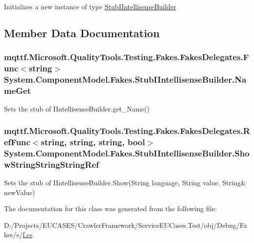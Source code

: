 Initializes a new instance of type \hyperlink{class_system_1_1_component_model_1_1_fakes_1_1_stub_i_intellisense_builder}{Stub\-I\-Intellisense\-Builder}



\subsection{Member Data Documentation}
\hypertarget{class_system_1_1_component_model_1_1_fakes_1_1_stub_i_intellisense_builder_a41a923772589db31412fe748a8acfd39}{
\subsubsection[{Name\-Get}]{\setlength{\rightskip}{0pt plus 5cm}mqttf.\-Microsoft.\-Quality\-Tools.\-Testing.\-Fakes.\-Fakes\-Delegates.\-Func$<$string$>$ System.\-Component\-Model.\-Fakes.\-Stub\-I\-Intellisense\-Builder.\-Name\-Get}}\label{class_system_1_1_component_model_1_1_fakes_1_1_stub_i_intellisense_builder_a41a923772589db31412fe748a8acfd39}


Sets the stub of I\-Intellisense\-Builder.\-get\-\_\-\-Name()

\hypertarget{class_system_1_1_component_model_1_1_fakes_1_1_stub_i_intellisense_builder_ac8894628bd802d4fc3fa15787f109384}{
\subsubsection[{Show\-String\-String\-String\-Ref}]{\setlength{\rightskip}{0pt plus 5cm}mqttf.\-Microsoft.\-Quality\-Tools.\-Testing.\-Fakes.\-Fakes\-Delegates.\-Ref\-Func$<$string, string, string, bool$>$ System.\-Component\-Model.\-Fakes.\-Stub\-I\-Intellisense\-Builder.\-Show\-String\-String\-String\-Ref}}\label{class_system_1_1_component_model_1_1_fakes_1_1_stub_i_intellisense_builder_ac8894628bd802d4fc3fa15787f109384}


Sets the stub of I\-Intellisense\-Builder.\-Show(String language, String value, String\& new\-Value)



The documentation for this class was generated from the following file\-:\begin{DoxyCompactItemize}
\item 
D\-:/\-Projects/\-E\-U\-C\-A\-S\-E\-S/\-Crawler\-Framework/\-Service\-E\-U\-Cases.\-Test/obj/\-Debug/\-Fakes/s/\hyperlink{s_2f_8cs}{f.\-cs}\end{DoxyCompactItemize}
